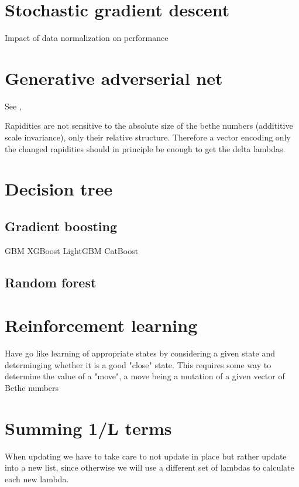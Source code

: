 \documentclass[11pt, a4paper,draft]{report} %
\begin{document}
\section{Stochastic gradient descent}
Impact of data normalization on performance

\section{Generative adverserial net}
See \cite{Liu2017}, \cite{Kratzwald2017}

Rapidities are not sensitive to the absolute size of the bethe numbers (addititive scale invariance), only their relative structure.
Therefore a vector encoding only the changed rapidities should in principle be enough to get the delta lambdas.

\section{Decision tree}

\subsection{Gradient boosting}

GBM
XGBoost
LightGBM
CatBoost

\subsection{Random forest}

\section{Reinforcement learning}
Have go like learning of appropriate states by considering a given state and determinging whether it is a good "close" state.
This requires some way to determine the value of a "move", a move being a mutation of a given vector of Bethe numbers\cite{Silver2017}

\section{Summing 1/L terms}

When updating we have to take care to not update in place but rather update into a new list, since otherwise we will use a different set of lambdas to calculate each new lambda.



\newpage
\end{document}
